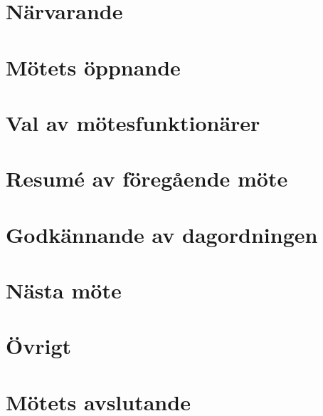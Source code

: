 \documentclass[a4paper]{article}
\begin{document}

\section*{\large Närvarande}

\section{Mötets öppnande}


\section{Val av mötesfunktionärer}


\section{Resumé av föregående möte}


\section{Godkännande av dagordningen}


\section{Nästa möte}


\section{Övrigt}


\section{Mötets avslutande}
\end{document}
